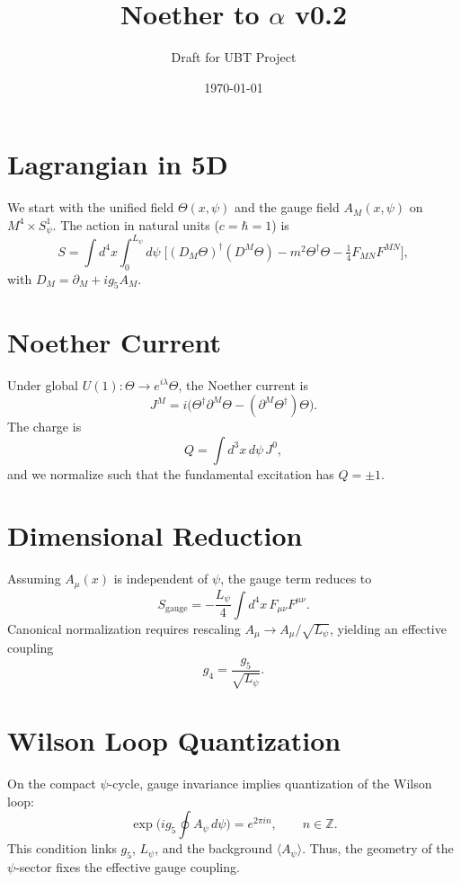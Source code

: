 \documentclass[12pt]{article}
\title{Noether to $\alpha$ v0.2}
\author{Draft for UBT Project}
\date{\today}
\begin{document}
\maketitle

\section{Lagrangian in 5D}
We start with the unified field $\Theta(x,\psi)$ and the gauge field $A_M(x,\psi)$ on $M^4 \times S^1_\psi$. 
The action in natural units ($c=\hbar=1$) is
\begin{equation}
S = \int d^4x \int_0^{L_\psi} d\psi \;
\Big[ (D_M \Theta)^\dagger (D^M \Theta)
 - m^2 \Theta^\dagger \Theta
 - \tfrac{1}{4} F_{MN}F^{MN} \Big],
\end{equation}
with $D_M = \partial_M + i g_5 A_M$.

\section{Noether Current}
Under global $U(1): \Theta \to e^{i\lambda}\Theta$, the Noether current is
\begin{equation}
J^M = i\big( \Theta^\dagger \partial^M \Theta - (\partial^M \Theta^\dagger)\Theta \big).
\end{equation}
The charge is
\begin{equation}
Q = \int d^3x \, d\psi \, J^0,
\end{equation}
and we normalize such that the fundamental excitation has $Q=\pm 1$.

\section{Dimensional Reduction}
Assuming $A_\mu(x)$ is independent of $\psi$, the gauge term reduces to
\begin{equation}
S_{\text{gauge}} = -\frac{L_\psi}{4} \int d^4x \, F_{\mu\nu}F^{\mu\nu}.
\end{equation}
Canonical normalization requires rescaling $A_\mu \to A_\mu/\sqrt{L_\psi}$, yielding an effective coupling
\begin{equation}
g_4 = \frac{g_5}{\sqrt{L_\psi}}.
\end{equation}

\section{Wilson Loop Quantization}
On the compact $\psi$-cycle, gauge invariance implies quantization of the Wilson loop:
\begin{equation}
\exp\!\Big( i g_5 \oint A_\psi \, d\psi \Big) = e^{2\pi i n}, \qquad n \in \mathbb{Z}.
\end{equation}
This condition links $g_5$, $L_\psi$, and the background $\langle A_\psi\rangle$. 
Thus, the geometry of the $\psi$-sector fixes the effective gauge coupling.
\end{document}

